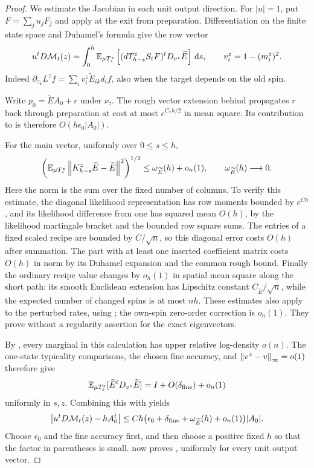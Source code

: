 \begin{proof}
We estimate the Jacobian in each unit output direction.  For $|u|=1$,
put $F=\sum_j u_jF_j$ and apply  at the exit
from preparation.  Differentiation on the finite state space and
Duhamel's formula give the row vector
\begin{equation}
 u^tD\mathcal M_t(z)
 =\int_0^h\mathbb E_{\mu T_s^z}
   \left[(dT_{h-s}^zS_tF)^tD_{v^z}\widetilde E\right]\,\mathrm d s,
 \qquad v_i^z=1-(m_i^z)^2.
 \label{eq:cutoff-duhamel-jacobian}
\end{equation}
Indeed $\partial_{z_k}L^zf=
\sum_i v_i^z\widetilde E_{ik}d_if$, also when the target depends on
the old spin.

Write $p_0=\widetilde E A_0+r$ under $\nu_z$.  The rough vector
extension behind  propagates
$r$ back through preparation at cost at most $e^{C_*h/2}$ in
mean square.  Its contribution to
 is therefore
$O(h\epsilon_0|A_0|)$.

For the main vector, uniformly over $0\le s\le h$,
\begin{equation}
 \left(\mathbb E_{\mu T_s^z}
   \left\lVert K_{h-s}^z\widetilde E-\widetilde E\right\rVert^2\right)^{1/2}
       \le\omega_{\widetilde E}(h)+o_n(1),
 \qquad \omega_{\widetilde E}(h)\longrightarrow0.
 \label{eq:cutoff-short-continuity}
\end{equation}
Here the norm is the sum over the fixed number of columns.  To
verify this estimate, the diagonal likelihood representation has
row moments bounded by $e^{C h}$, and its likelihood difference
from one has squared mean $O(h)$, by the likelihood martingale
bracket and the bounded row square sums.  The entries of a fixed
scaled recipe are bounded by $C/\sqrt n$, so this diagonal error
costs $O(h)$ after summation.  The part with at least one inserted
coefficient matrix costs $O(h)$ in norm by its Duhamel expansion
and the common rough bound.  Finally the ordinary recipe value
changes by $o_h(1)$ in spatial mean square along the short path:
its smooth Euclidean extension has Lipschitz constant
$C_{\widetilde E}/\sqrt n$, while the expected number of changed
spins is at most $nh$.  These estimates also apply to the perturbed
rates, using ; the own-spin
zero-order correction is $o_n(1)$.  They prove
 without a regularity assertion for
the exact eigenvectors.

By , every marginal in this
calculation has upper relative log-density $o(n)$.
The one-state typicality comparisons, the chosen fine accuracy,
and $\left\lVert v^z-v\right\rVert_\infty=o(1)$ therefore give
\[
 \mathbb E_{\mu T_s^z}[\widetilde E^tD_{v^z}\widetilde E]
       =I+O(\delta_{\rm fine})+o_n(1)
\]
uniformly in $s,z$.  Combining this with
 yields
\[
 \left|u^tD\mathcal M_t(z)-hA_0^t\right|
 \le Ch\bigl(\epsilon_0+\delta_{\rm fine}
                   +\omega_{\widetilde E}(h)+o_n(1)\bigr)|A_0|.
\]
Choose $\epsilon_0$ and the fine accuracy first, and then choose a
positive fixed $h$ so that the factor in parentheses is small.
 now proves
, uniformly for every unit output vector.


\end{proof}
